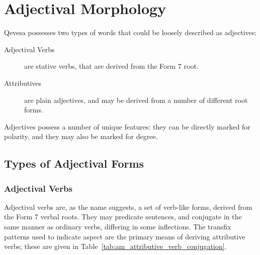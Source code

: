 \documentclass[grammar]{subfiles}
\begin{document}
  \chapter{Adjectival Morphology}
  \label{ch:adjectival-morphology}

  Qevesa possesses two types of words that could be loosely described as adjectives:

  \begin{description}
    \item[Adjectival Verbs] are stative verbs, that are derived from the Form 7 root.
    \item[Attributives] are plain adjectives, and may be derived from a number of different root forms.
  \end{description}

  Adjectives possess a number of unique features: they can be directly marked for polarity, and they may also be marked for degree.


  \section{Types of Adjectival Forms}
  \label{sec:am_adjectival_forms}

  \subsection{Adjectival Verbs}
  \label{ssec:am_adjectival_verbs}

  Adjectival verbs are, as the name suggests, a set of verb-like forms, derived from the Form 7 verbal roots. 
  They may predicate sentences, and conjugate in the same manner as ordinary verbs, differing in some inflections. %
  The transfix patterns used to indicate aspect are the primary means of deriving attributive verbs; these are given in Table~\ref{tab:am_attributive_verb_conjugation}.
\end{document}
